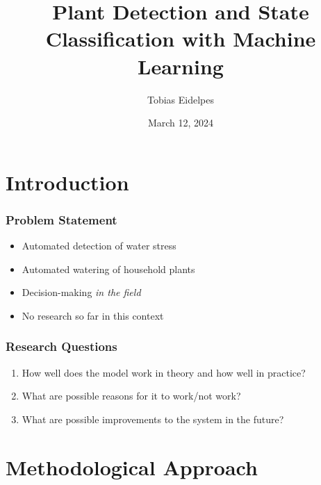 \documentclass{beamer}
\begin{document}
\title[Plant Detection and State Classification]{Plant Detection and
  State Classification with Machine Learning}
\author{Tobias Eidelpes}
\date{March 12, 2024}

\begin{frame}
  \maketitle
\end{frame}

\section{Introduction}

\begin{frame}
  \frametitle{Problem Statement}
  \begin{itemize}
    \setlength{\itemsep}{1.1\baselineskip}
  \item Automated detection of water stress \pause
  \item Automated watering of household plants \pause
  \item Decision-making \emph{in the field} \pause
  \item No research so far in this context
  \end{itemize}
\end{frame}

\begin{frame}
  \frametitle{Research Questions}
  \begin{enumerate}
    \setlength{\itemsep}{1.1\baselineskip}
  \item How well does the model work in theory and how well in
    practice? \pause
  \item What are possible reasons for it to work/not work? \pause
  \item What are possible improvements to the system in the future?
  \end{enumerate}
\end{frame}

\section{Methodological Approach}
\end{document}
